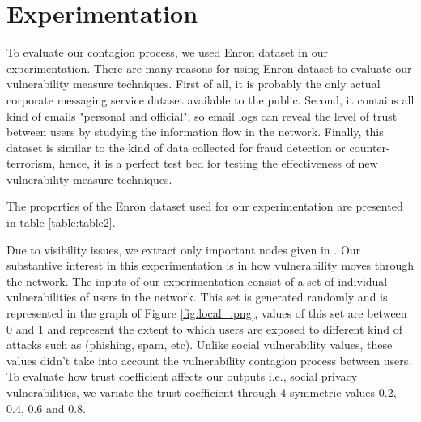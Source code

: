 \section{Experimentation} \label{sec:Experimentation}

To evaluate our contagion process,
	we used Enron dataset in our experimentation.
There are many reasons for using Enron dataset to evaluate our vulnerability measure techniques.
First of all,
	it is probably the only actual corporate messaging service dataset available to the public.
Second,
	it contains all kind of emails "personal and official",
	so email logs can reveal the level of trust between users by studying the information flow in the network.
Finally,
	this dataset is similar to the kind of data collected for fraud detection or counter-terrorism,
	hence,
	it is a perfect test bed for testing the effectiveness of new vulnerability measure techniques.

The properties of the Enron dataset used for our experimentation are presented in table \ref{table:table2}.



Due to visibility issues,
	we extract only important nodes given in \cite{shetty_discovering_2005}.
Our substantive interest in this experimentation is in how vulnerability moves through the network.
The inputs of our experimentation consist of a set of individual vulnerabilities of users in the network.
This set is generated randomly and is represented in the graph of Figure \ref{fig:local_.png},
	values of this set are between 0 and 1 and represent the extent to which users are exposed to different kind of attacks such as (phishing, spam, etc).
Unlike social vulnerability values,
	these values didn't take into account the vulnerability contagion process between users.
To evaluate how trust coefficient affects our outputs i.e., social privacy vulnerabilities,
	we variate the trust coefficient through 4 symmetric values 0.2, 0.4, 0.6 and 0.8.



